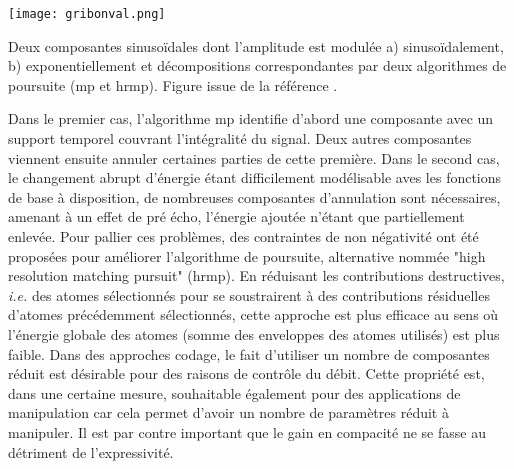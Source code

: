 \begin{marginfigure}
  \texttt{[image: gribonval.png]}
  \caption{Deux composantes sinusoïdales dont l'amplitude est modulée a) sinusoïdalement, b) exponentiellement et décompositions correspondantes par deux algorithmes de poursuite (mp et hrmp). Figure issue de la référence .}
  \label{fig:gribonval}
\end{marginfigure}

Dans le premier cas, l'algorithme mp identifie d'abord une composante avec un support temporel couvrant l'intégralité du signal. Deux autres composantes viennent ensuite annuler certaines parties de cette première. Dans le second cas, le changement abrupt d'énergie étant difficilement modélisable aves les fonctions de base à disposition, de nombreuses composantes d'annulation sont nécessaires, amenant à un effet de pré écho, l'énergie ajoutée n'étant que partiellement enlevée. Pour pallier ces problèmes, des contraintes de non négativité ont été proposées pour améliorer l'algorithme de poursuite, alternative nommée "high resolution matching pursuit" (hrmp). En réduisant les contributions destructives, \textit{i.e.} des atomes sélectionnés pour se soustrairent à des contributions résiduelles d'atomes précédemment sélectionnés, cette approche est plus efficace au sens où l'énergie globale des atomes (somme des enveloppes des atomes utilisés) est plus faible. Dans des approches codage, le fait d'utiliser un nombre de composantes réduit est désirable pour des raisons de contrôle du débit. Cette propriété est, dans une certaine mesure, souhaitable également pour des applications de manipulation car cela permet d'avoir un nombre de paramètres réduit à manipuler. Il est par contre important que le gain en compacité ne se fasse au détriment de l'expressivité.




